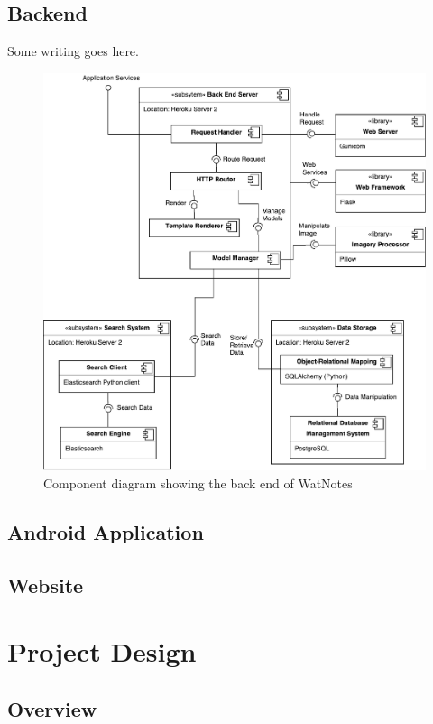 \documentclass[12pt]{article}
\begin{document}
  \subsection{Backend}
    Some writing goes here.
    \begin{figure}[H]
      \includegraphics[width=\textwidth]{assets/backend-component.pdf}
      \caption{Component diagram showing the back end of WatNotes}
    \end{figure}

  \subsection{Android Application}
  \subsection{Website}

  \newpage

  \section{Project Design}
  \subsection{Overview}
\end{document}
